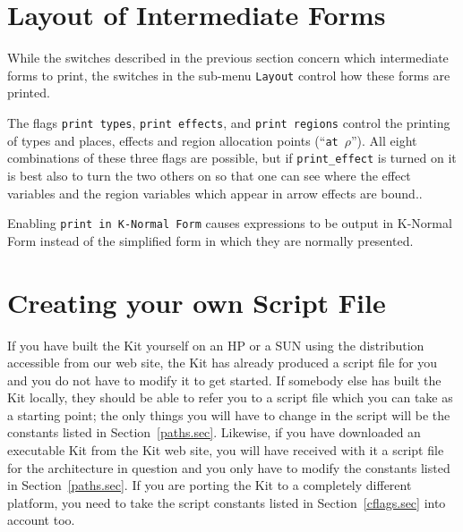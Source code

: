 \documentclass[12pt]{book}
\begin{document}
\section{Layout of Intermediate Forms}
While the switches described in the previous section concern which
intermediate forms to print, the switches in the sub-menu
\texttt{Layout} control how these forms are
printed.

The flags \texttt{print types}, \texttt{print effects}, and
\texttt{print regions} control the printing of types and places,
effects and region allocation points (``\texttt{at}~$\rho$'').
All eight combinations of these three flags are possible, but if
{\tt print\_effect} is turned on it is best also to turn the two
others on so that one can see where the effect variables and the region variables
which appear in arrow effects are bound..


Enabling \texttt{print in K-Normal Form} causes  expressions to be output
in K-Normal Form instead of the simplified form in which they are
normally presented.
%
\section{Creating your own Script File}
\label{scriptmodify.sec}
%
If you have built the Kit yourself on an HP or a SUN using
the distribution accessible from our web site, the Kit has
already produced a script file for you and you do not have
to modify it to get started. If somebody else has built
the Kit locally, they should be able to refer you to a script file which you
can take as a starting point; the only things you will
have to change in the script will be the constants
listed in Section~\ref{paths.sec}. Likewise, if
you have downloaded an executable Kit from the Kit web site,
you will have received with it a script file for the architecture
in question and you only have to modify the constants listed
in Section~\ref{paths.sec}.
If you are porting the Kit to a completely 
different platform, you need to take the script constants 
listed in Section~\ref{cflags.sec} into account too.
\end{document}
